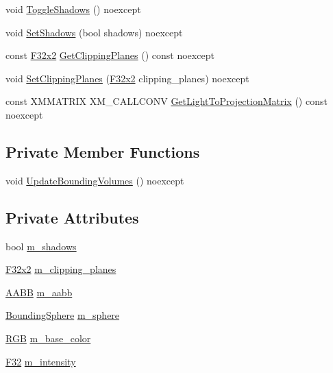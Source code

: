 \begin{DoxyCompactItemize}
\item 
void \mbox{\hyperlink{classmage_1_1rendering_1_1_omni_light_aa1816fad8913711c10994b66103279a2}{Toggle\+Shadows}} () noexcept
\item 
void \mbox{\hyperlink{classmage_1_1rendering_1_1_omni_light_a2817ab7a4c514785f01bf2e40c6245cb}{Set\+Shadows}} (bool shadows) noexcept
\item 
const \mbox{\hyperlink{namespacemage_aee4759dedc8def6c6dec26b5c7eddf29}{F32x2}} \mbox{\hyperlink{classmage_1_1rendering_1_1_omni_light_a30b6cbf1fd7a6058856a491c2ce75005}{Get\+Clipping\+Planes}} () const noexcept
\item 
void \mbox{\hyperlink{classmage_1_1rendering_1_1_omni_light_af1334671baf6f5afeb297fb819118639}{Set\+Clipping\+Planes}} (\mbox{\hyperlink{namespacemage_aee4759dedc8def6c6dec26b5c7eddf29}{F32x2}} clipping\+\_\+planes) noexcept
\item 
const X\+M\+M\+A\+T\+R\+IX X\+M\+\_\+\+C\+A\+L\+L\+C\+O\+NV \mbox{\hyperlink{classmage_1_1rendering_1_1_omni_light_aa93d9722b3480fc9997761af89a6d90d}{Get\+Light\+To\+Projection\+Matrix}} () const noexcept
\end{DoxyCompactItemize}
\subsection*{Private Member Functions}
\begin{DoxyCompactItemize}
\item 
void \mbox{\hyperlink{classmage_1_1rendering_1_1_omni_light_a44c6dee7d24c879aab0284ac21910337}{Update\+Bounding\+Volumes}} () noexcept
\end{DoxyCompactItemize}
\subsection*{Private Attributes}
\begin{DoxyCompactItemize}
\item 
bool \mbox{\hyperlink{classmage_1_1rendering_1_1_omni_light_af0cb508d0333f86cf64c28f5628177d4}{m\+\_\+shadows}}
\item 
\mbox{\hyperlink{namespacemage_aee4759dedc8def6c6dec26b5c7eddf29}{F32x2}} \mbox{\hyperlink{classmage_1_1rendering_1_1_omni_light_a725388093feb1e5ed2ebce4f70c1729b}{m\+\_\+clipping\+\_\+planes}}
\item 
\mbox{\hyperlink{classmage_1_1_a_a_b_b}{A\+A\+BB}} \mbox{\hyperlink{classmage_1_1rendering_1_1_omni_light_ac2b5bb2e28364445c7bce70c8fa1374e}{m\+\_\+aabb}}
\item 
\mbox{\hyperlink{classmage_1_1_bounding_sphere}{Bounding\+Sphere}} \mbox{\hyperlink{classmage_1_1rendering_1_1_omni_light_af11a99e2b1500093b9bd0e3ff16b04e6}{m\+\_\+sphere}}
\item 
\mbox{\hyperlink{structmage_1_1_r_g_b}{R\+GB}} \mbox{\hyperlink{classmage_1_1rendering_1_1_omni_light_ac5aca97b5729d9c0856ed08f64976edf}{m\+\_\+base\+\_\+color}}
\item 
\mbox{\hyperlink{namespacemage_aa97e833b45f06d60a0a9c4fc22ae02c0}{F32}} \mbox{\hyperlink{classmage_1_1rendering_1_1_omni_light_af7ba6e05e5809d16ec070a2b2de47a62}{m\+\_\+intensity}}
\end{DoxyCompactItemize}
